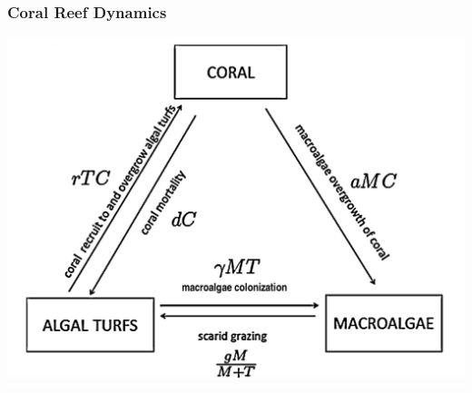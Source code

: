 \begin{frame}
\frametitle{Coral Reef Dynamics}
\includegraphics[scale=.175]{./coral-reef-triangle.png}
\end{frame}

